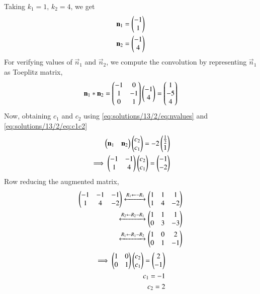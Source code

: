 Taking $k_1 = 1$, $k_2 = 4$, we get
\begin{align}
    \mathbf{n}_1 = \begin{pmatrix}-1 \\ 1\end{pmatrix}\nonumber\\
    \mathbf{n}_2 = \begin{pmatrix}-1 \\ 4\end{pmatrix}\label{eq:solutions/13/2/eq:nvalues}
\end{align}
For verifying values of $\vec{n}_1$ and $\vec{n}_2$, we compute the convolution by representing $\vec{n}_1$ as Toeplitz matrix,
\begin{align}
    \mathbf{n}_1*\mathbf{n}_2=\begin{pmatrix}-1 & 0 \\ 1 & -1 \\ 0 & 1\end{pmatrix}\begin{pmatrix}-1 \\ 4\end{pmatrix} = \begin{pmatrix}1 \\ -5 \\ 4\end{pmatrix}
\end{align}
Now, obtaining $c_1$ and $c_2$ using \eqref{eq:solutions/13/2/eq:nvalues} and \eqref{eq:solutions/13/2/eq:c1c2}
\begin{align}
    \begin{pmatrix}\mathbf{n}_1 & \mathbf{n}_2\end{pmatrix}\begin{pmatrix}c_2 \\ c_1\end{pmatrix} = -2\begin{pmatrix}\frac{1}{2} \\ 1\end{pmatrix}\\
    \implies \begin{pmatrix}-1 & -1 \\ 1 & 4\end{pmatrix}\begin{pmatrix}c_2 \\ c_1\end{pmatrix} = \begin{pmatrix}-1 \\ -2\end{pmatrix}
\end{align}
Row reducing the augmented matrix,
\begin{align}
    \begin{pmatrix}-1 & -1 & -1 \\ 1 & 4 & -2\end{pmatrix} \xleftrightarrow{R_1 \leftarrow -R_1}\begin{pmatrix}1 & 1 & 1 \\ 1 & 4 & -2\end{pmatrix}\\\xleftrightarrow{R_2\leftarrow R_2-R_1}\begin{pmatrix}1 & 1 & 1 \\ 0 & 3 & -3\end{pmatrix}\\
    \xleftrightarrow{R_1\leftarrow R_1-R_2}\begin{pmatrix}1 & 0 & 2 \\ 0 & 1 & -1\end{pmatrix}
\end{align}
\begin{align}
    \implies \begin{pmatrix}1 & 0 \\ 0 & 1\end{pmatrix}\begin{pmatrix}c_2 \\ c_1\end{pmatrix} = \begin{pmatrix}2 \\ -1\end{pmatrix}\nonumber\\
    c_1 = -1\\
    c_2 = 2\label{eq:solutions/13/2/eq:cvalues}
\end{align}
